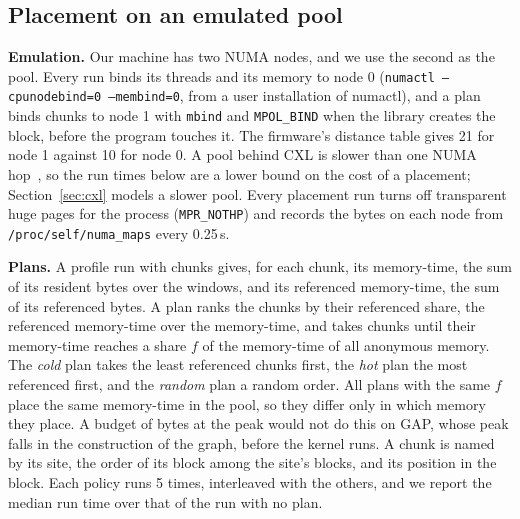 \documentclass[11pt]{article}
\newcommand{\secref}[1]{Section~\ref{#1}}
\newcommand{\term}[1]{\emph{#1}}
\begin{document}
\subsection{Placement on an emulated pool}

\textbf{Emulation.} Our machine has two NUMA nodes, and we use the second as the pool. Every run binds its threads and
its memory to node 0 (\texttt{numactl --cpunodebind=0 --membind=0}, from a user installation of numactl), and a plan
binds chunks to node 1 with \texttt{mbind} and \texttt{MPOL\_BIND} when the library creates the block, before the
program touches it. The firmware's distance table gives 21 for node 1 against 10 for node 0. A pool behind CXL is
slower than one NUMA hop~\cite{Li2023Pond}, so the run times below are a lower bound on the cost of a placement;
\secref{sec:cxl} models a slower pool. Every
placement run turns off transparent huge pages for the process (\texttt{MPR\_NOTHP}) and records the bytes on each
node from \texttt{/proc/self/numa\_maps} every 0.25\,s.

\textbf{Plans.} A profile run with chunks gives, for each chunk, its memory-time, the sum of its resident bytes over
the windows, and its referenced memory-time, the sum of its referenced bytes. A plan ranks the chunks by their
referenced share, the referenced memory-time over the memory-time, and takes chunks until their memory-time reaches a
share $f$ of the memory-time of all anonymous memory. The \term{cold} plan takes the least referenced chunks first,
the \term{hot} plan the most referenced first, and the \term{random} plan a random order. All plans with the same $f$
place the same memory-time in the pool, so they differ only in which memory they place. A budget of bytes at the peak
would not do this on GAP, whose peak falls in the construction of the graph, before the kernel runs. A chunk is named
by its site, the order of its block among the site's blocks, and its position in the block. Each policy runs 5 times,
interleaved with the others, and we report the median run time over that of the run with no plan.

\begin{table}[t]
\centering
\small
\caption{Static placement: run time with a plan over the run with no plan ($\times$), median of 5 runs, for all
memory on node 1 (remote) and for plans that place 25\% or 50\% of the memory-time in the pool, cold, random or hot
first. The plans from the smaller input come from GAP at a scale of 16 and CPython and Lua at a quarter of the input,
with windows of 0.02\,s, applied at a scale of 18 and the full input. They ran in a separate set of runs with its own
baseline.}
\label{tab:place-static}
\setlength{\tabcolsep}{3.5pt}

\end{table}
\end{document}
